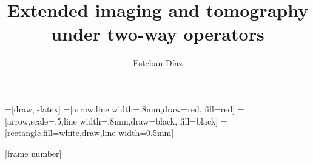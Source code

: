 


\title[]{Extended imaging and tomography under two-way operators}
\subtitle{}
\author[]{Esteban D\'{i}az}
\date{}
\logo{}



\huge

\def\big#1{\begin{center} \LARGE \textbf{#1} \end{center}}
\def\cen#1{\begin{center}        \textbf{#1} \end{center}}


=[draw, -latex] 
=[arrow,line width=.8mm,draw=red, fill=red]
=[arrow,scale=.5,line width=.8mm,draw=black, fill=black]
=[rectangle,fill=white,draw,line width=0.5mm]


 { \cwpcover }

[frame number] 





\begin{frame}
\vspace{-2cm}
\end{frame}
\begin{frame}
\vspace{-2cm}
\end{frame}


\begin{frame}
\vspace{-2cm}
\end{frame}



\begin{frame}
\vspace{-2cm}
\end{frame}

\begin{frame}
\vspace{-2cm}
\end{frame}


\begin{frame}
\vspace{-2cm}
\end{frame}




